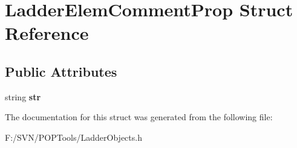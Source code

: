 \hypertarget{struct_ladder_elem_comment_prop}{\section{Ladder\-Elem\-Comment\-Prop Struct Reference}
\label{struct_ladder_elem_comment_prop}
}
\subsection*{Public Attributes}
\begin{DoxyCompactItemize}
\item 
\hypertarget{struct_ladder_elem_comment_prop_a760d1f8f75a32d9cd5a99aba3fc86433}{string {\bfseries str}}\label{struct_ladder_elem_comment_prop_a760d1f8f75a32d9cd5a99aba3fc86433}

\end{DoxyCompactItemize}


The documentation for this struct was generated from the following file\-:\begin{DoxyCompactItemize}
\item 
F\-:/\-S\-V\-N/\-P\-O\-P\-Tools/Ladder\-Objects.\-h\end{DoxyCompactItemize}

